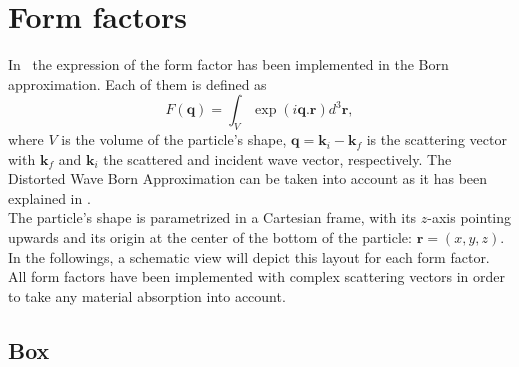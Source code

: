 

\clearpage{\thispagestyle{empty}\cleardoublepage}

\chapter{Form factors} \label{app:ff}

\hypertarget{formfactors}{}
In \BornAgain\ the expression of the form factor has been implemented in the Born approximation. Each of them is defined as
\begin{equation*}
F(\mathbf{q})=\int_V \exp (i\mathbf{q}.\mathbf{r}) d^3 \mathbf{r},
\end{equation*}
where $V$ is the volume of the particle's shape,
$\mathbf{q}=\mathbf{k}_i - \mathbf{k}_f$ is the scattering vector with
$\mathbf{k}_f$ and $\mathbf{k}_i$ the scattered and incident wave
vector, respectively. The Distorted Wave Born Approximation can be taken into account as it has been explained in .\\

The particle's shape is parametrized in a Cartesian frame, with its
$z$-axis pointing upwards and its origin at the center of the bottom
of the particle: $\mathbf{r}=(x,y,z)$. In the followings, a schematic view will depict this layout for each
form factor.\\


All form factors have been implemented with complex scattering vectors
in order to take any material absorption into account.\\

\newpage
\section{Box} 

